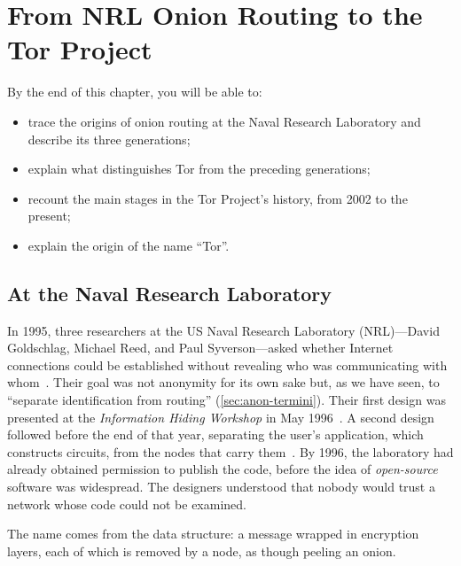 \chapter{From NRL Onion Routing to the Tor Project}\label{cap:03-nascita-tor}

\begin{obiettivi}
By the end of this chapter, you will be able to:
\begin{itemize}[nosep]
  \item trace the origins of onion routing at the Naval Research Laboratory and describe its three generations;
  \item explain what distinguishes Tor from the preceding generations;
  \item recount the main stages in the Tor Project's history, from 2002 to the present;
  \item explain the origin of the name \enquote{Tor}.
\end{itemize}
\end{obiettivi}

\section{At the Naval Research Laboratory}\label{sec:nascita-nrl}

In 1995, three researchers at the US Naval Research Laboratory (NRL)---David Goldschlag, Michael Reed, and Paul Syverson---asked whether Internet connections could be established without revealing who was communicating with whom~\cite{torhistory}. Their goal was not anonymity for its own sake but, as we have seen, to \enquote{separate identification from routing} (\cref{sec:anon-termini}). Their first design was presented at the \emph{Information Hiding Workshop} in May 1996~\cite{goldschlag1996hiding}. A second design followed before the end of that year, separating the user's application, which constructs circuits, from the nodes that carry them~\cite{syverson2011peel}. By 1996, the laboratory had already obtained permission to publish the code, before the idea of \emph{open-source} software was widespread. The designers understood that nobody would trust a network whose code could not be examined.

The name comes from the data structure: a message wrapped in encryption layers, each of which is removed by a node, as though peeling an onion.

